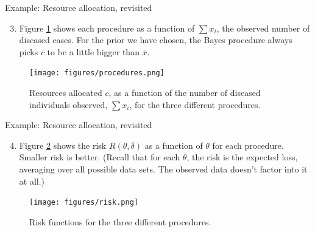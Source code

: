 \documentclass[
  ignorenonframetext,
]{beamer}
\providecommand{\tightlist}{%
  \setlength{\itemsep}{0pt}\setlength{\parskip}{0pt}}
\begin{document}
\begin{frame}{Example: Resource allocation, revisited}
\protect\hypertarget{example-resource-allocation-revisited-1}{}

\begin{enumerate}
\setcounter{enumi}{2}
\tightlist
\item
  Figure \ref{figure:procedures} shows each procedure as a function of
  \(\sum x_i\), the observed number of diseased cases. For the prior we
  have chosen, the Bayes procedure always picks \(c\) to be a little
  bigger than \(\bar x\).
\end{enumerate}

\begin{figure}
  \begin{center}
    \texttt{[image: figures/procedures.png]}
  \end{center}
  \caption{Resources allocated $c$, as a function of the number of diseased individuals observed, $\sum x_i$, for the three different procedures.}
  \label{figure:procedures}
\end{figure}

\end{frame}

\begin{frame}{Example: Resource allocation, revisited}
\protect\hypertarget{example-resource-allocation-revisited-2}{}

\begin{enumerate}
\setcounter{enumi}{3}
\tightlist
\item
  Figure \ref{figure:risk} shows the risk \(R(\theta,\delta)\) as a
  function of \(\theta\) for each procedure. Smaller risk is better.
  (Recall that for each \(\theta\), the risk is the expected loss,
  averaging over all possible data sets. The observed data doesn't
  factor into it at all.)
\end{enumerate}

\begin{figure}
  \begin{center}
    \texttt{[image: figures/risk.png]}
  \end{center}
  \caption{Risk functions for the three different procedures.}
  \label{figure:risk}
\end{figure}

\end{frame}
\end{document}
